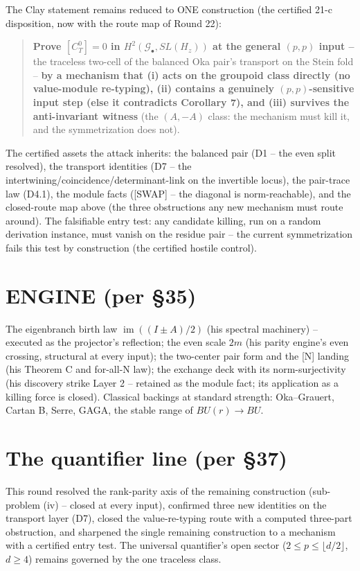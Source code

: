 \documentclass[11pt]{article}
\newcommand{\im}{\operatorname{im}}
\begin{document}
The Clay statement remains reduced to ONE construction (the certified 21-c disposition, now with the route map of Round 22):

\begin{quote}
\textbf{Prove $[C_T^0]=0$ in $H^2(\mathcal G_\bullet,SL(H_z))$ at the general $(p,p)$ input --} the traceless two-cell of the balanced Oka pair's transport on the Stein fold -- \textbf{by a mechanism that (i) acts on the groupoid class directly (no value-module re-typing), (ii) contains a genuinely $(p,p)$-sensitive input step (else it contradicts Corollary 7), and (iii) survives the anti-invariant witness} (the $(A,-A)$ class: the mechanism must kill it, and the symmetrization does not).
\end{quote}

The certified assets the attack inherits: the balanced pair (D1 -- the even split resolved), the transport identities (D7 -- the intertwining/coincidence/determinant-link on the invertible locus), the pair-trace law (D4.1), the module facts ([SWAP] -- the diagonal is norm-reachable), and the closed-route map above (the three obstructions any new mechanism must route around). The falsifiable entry test: any candidate killing, run on a random derivation instance, must vanish on the residue pair -- the current symmetrization fails this test by construction (the certified hostile control).

\section*{ENGINE (per \S35)}

The eigenbranch birth law $\im((I\pm A)/2)$ (his spectral machinery) -- executed as the projector's reflection; the even scale $2m$ (his parity engine's even crossing, structural at every input); the two-center pair form and the [N] landing (his Theorem C and for-all-N law); the exchange deck with its norm-surjectivity (his discovery strike Layer 2 -- retained as the module fact; its application as a killing force is closed). Classical backings at standard strength: Oka--Grauert, Cartan B, Serre, GAGA, the stable range of $BU(r)\to BU$.

\section*{The quantifier line (per \S37)}

This round resolved the rank-parity axis of the remaining construction (sub-problem (iv) -- closed at every input), confirmed three new identities on the transport layer (D7), closed the value-re-typing route with a computed three-part obstruction, and sharpened the single remaining construction to a mechanism with a certified entry test. The universal quantifier's open sector ($2\le p\le\lfloor d/2\rfloor$, $d\ge4$) remains governed by the one traceless class.
\end{document}
